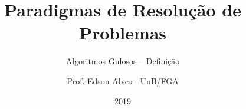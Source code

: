 \title{Paradigmas de Resolução de Problemas}
\subtitle{Algoritmos Gulosos -- Definição}
\author{Prof. Edson Alves - UnB/FGA}
\date{2019}
